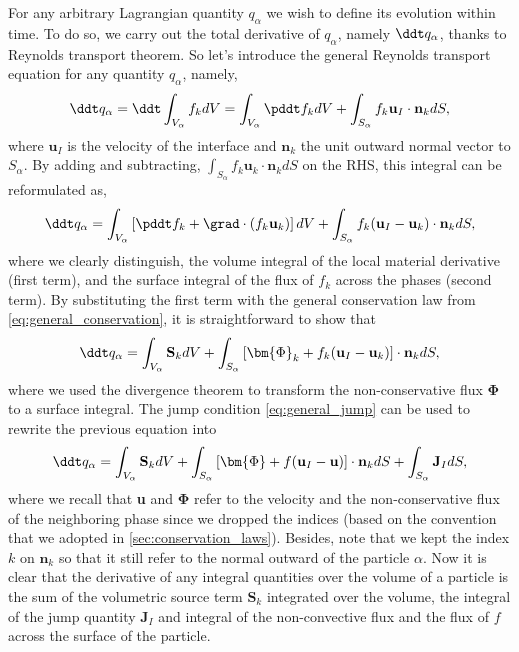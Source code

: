 For any arbitrary Lagrangian quantity $q_\alpha$ we wish to define its evolution within time. 
To do so, we carry out the total derivative of $q_\alpha$, namely $\ddt q_\alpha$, thanks to Reynolds transport theorem.
So let's introduce the general Reynolds transport equation for any quantity $q_\alpha$, namely, 
\begin{equation*}
    \ddt  q_\alpha 
    = \ddt \int_{V_\alpha} f_k dV 
    = \int_{V_\alpha} \pddt f_kdV 
    + \int_{S_\alpha} f_k \textbf{u}_I \cdot \textbf{n}_k d S,
\end{equation*}
where $\textbf{u}_I$ is the velocity of the interface and $\textbf{n}_k$ the unit outward normal vector to $S_\alpha$. 
By adding and subtracting, $\int_{S_\alpha} f_k \textbf{u}_k\cdot \textbf{n}_k dS$ on the RHS,  this integral can be reformulated as,
\begin{equation}
    \ddt  q_\alpha 
    = \int_{V_\alpha}\left[ \pddt f_k + \grad \cdot\left(f_k\textbf{u}_k\right) \right]dV 
    + \int_{S_\alpha} f_k (\textbf{u}_I-\textbf{u}_k)\cdot \textbf{n}_k d S,
    \label{eq:q_alpha_dt}
\end{equation}
where we clearly distinguish, the volume integral of the local material derivative (first term), and the surface integral of the flux of $f_k$ across the phases (second term).
By substituting the first term with the general conservation law from \ref{eq:general_conservation}, it is straightforward to show that 
\begin{equation}
    \ddt  q_\alpha 
    = \int_{V_\alpha} \textbf{S}_k dV 
    + \int_{S_\alpha} \left[\bm{\Phi}_k + f_k (\textbf{u}_I-\textbf{u}_k) \right] \cdot \textbf{n}_k d S,
\end{equation}
where we used the divergence theorem to transform the non-conservative flux $\bm{\Phi}$ to a surface integral. 
The jump condition \ref{eq:general_jump} can be used to rewrite the previous equation into
\begin{equation}
    \ddt  q_\alpha 
    = \int_{V_\alpha} \textbf{S}_k dV 
    + \int_{S_\alpha} \left[\bm{\Phi} + f (\textbf{u}_I-\textbf{u}) \right] \cdot \textbf{n}_k d S
    + \int_{S_\alpha} \textbf{J}_I dS,
    \label{eq:q_alpha_balance}
\end{equation}
where we recall that \textbf{u} and $\bm{\Phi}$ refer to the velocity and the non-conservative flux of the neighboring phase since we dropped the indices (based on the convention that we adopted in \ref{sec:conservation_laws}). 
Besides, note that we kept the index $k$ on $\textbf{n}_k$ so that it still refer to the normal outward of the particle $\alpha$. 
Now it is clear that the derivative of any integral quantities over the volume of a particle is the sum of the volumetric source term $\textbf{S}_k$ integrated over the volume, the integral of the jump quantity $\textbf{J}_I$ and integral of the non-convective flux and the flux of $f$ across the surface of the particle. 

